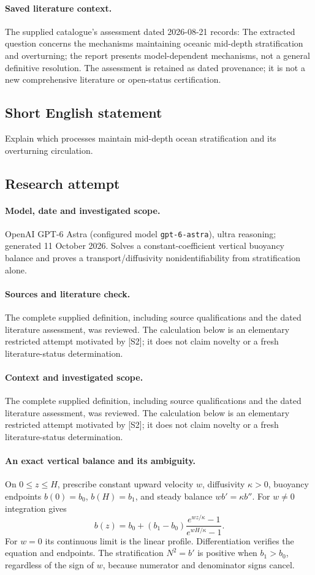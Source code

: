 \documentclass[11pt]{article}
\begin{document}
\paragraph{Saved literature context.} The supplied catalogue's assessment dated 2026-08-21 records: The extracted question concerns the mechanisms maintaining oceanic mid-depth stratification and overturning; the report presents model-dependent mechanisms, not a general definitive resolution. The assessment is retained as dated provenance; it is not a new comprehensive literature or open-status certification.
\subsection{Short English statement}
Explain which processes maintain mid-depth ocean stratification and its overturning circulation.
\subsection{Research attempt}
\paragraph{Model, date and investigated scope.}
OpenAI GPT-6 Astra (configured model \texttt{gpt-6-astra}), ultra reasoning; generated 11 October 2026. Solves a constant-coefficient vertical buoyancy balance and proves a transport/diffusivity nonidentifiability from stratification alone.

\paragraph{Sources and literature check.}
The complete supplied definition, including source qualifications and the dated literature assessment, was reviewed. The calculation below is an elementary restricted attempt motivated by [S2]; it does not claim novelty or a fresh literature-status determination.

\paragraph{Context and investigated scope.} The complete supplied definition, including source qualifications and the dated literature assessment, was reviewed. The calculation below is an elementary restricted attempt motivated by [S2]; it does not claim novelty or a fresh literature-status determination.

\paragraph{An exact vertical balance and its ambiguity.} On $0\leq z\leq H$, prescribe constant upward velocity $w$, diffusivity $\kappa>0$, buoyancy endpoints $b(0)=b_0$, $b(H)=b_1$, and steady balance $wb'=\kappa b''$. For $w\ne0$ integration gives
\[
 b(z)=b_0+(b_1-b_0)\frac{e^{wz/\kappa}-1}{e^{wH/\kappa}-1}.
\]
For $w=0$ its continuous limit is the linear profile. Differentiation verifies the equation and endpoints. The stratification $N^2=b'$ is positive when $b_1>b_0$, regardless of the sign of $w$, because numerator and denominator signs cancel.
\end{document}
